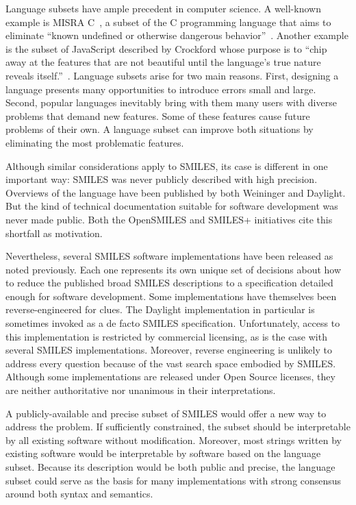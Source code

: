 \documentclass{article}
\begin{document}
Language subsets have ample precedent in computer science. A well-known example is MISRA C~\cite{misraC}, a subset of the C programming language that aims to eliminate \enquote{known undefined or otherwise dangerous behavior}~\cite{hatton:2007}. Another example is the subset of JavaScript described by Crockford whose purpose is to \enquote{chip away at the features that are not beautiful until the language's true nature reveals itself.}~\cite{crockford:2008}. Language subsets arise for two main reasons. First, designing a language presents many opportunities to introduce errors small and large. Second, popular languages inevitably bring with them many users with diverse problems that demand new features. Some of these features cause future problems of their own. A language subset can improve both situations by eliminating the most problematic features.

Although similar considerations apply to SMILES, its case is different in one important way: SMILES was never publicly described with high precision. Overviews of the language have been published by both Weininger and Daylight. But the kind of technical documentation suitable for software development was never made public. Both the OpenSMILES and SMILES+ initiatives cite this shortfall as motivation.

Nevertheless, several SMILES software implementations have been released as noted previously. Each one represents its own unique set of decisions about how to reduce the published broad SMILES descriptions to a specification detailed enough for software development. Some implementations have themselves been reverse-engineered for clues. The Daylight implementation in particular is sometimes invoked as a de facto SMILES specification. Unfortunately, access to this implementation is restricted by commercial licensing, as is the case with several SMILES implementations. Moreover, reverse engineering is unlikely to address every question because of the vast search space embodied by SMILES. Although some implementations are released under Open Source licenses, they are neither authoritative nor unanimous in their interpretations.

A publicly-available and precise subset of SMILES would offer a new way to address the problem. If sufficiently constrained, the subset should be interpretable by all existing software without modification. Moreover, most strings written by existing software would be interpretable by software based on the language subset. Because its description would be both public and precise, the language subset could serve as the basis for many implementations with strong consensus around both syntax and semantics.
\end{document}

